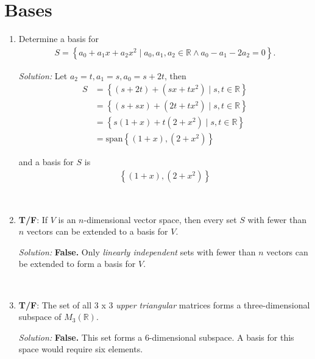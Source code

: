 \documentclass[a4paper,10pt]{report}
\begin{document}
\chapter{Bases}
\begin{enumerate}
  \item
    Determine a basis for
    \begin{align*}
    S = \left\{a_0 + a_1 x + a_2 x^2\mid a_0,a_1,a_2 \in \mathbb{R} \land a_0 - a_1 -2a_2 =0\right\}.
    \end{align*}

    \hrulefill

    \textit{Solution:}
    Let $a_2=t, a_1=s, a_0=s+2t$, then
    \begin{align*}
    S 	  &= \left\{ (s+2t) + (sx+tx^2)\mid s,t\in\mathbb{R} \right\} \\
	  &= \left\{ (s+sx) + (2t+tx^2)\mid s,t\in\mathbb{R} \right\} \\
	  &= \left\{ s(1+x) + t(2+x^2)\mid s,t\in\mathbb{R} \right\} \\
	  &= \text{span}\left\{(1+x),(2+x^2)\right\}
    \end{align*}

    and a basis for $S$ is
    \begin{align*}
    \left\{(1+x), (2+x^2)\right\}
    \end{align*}

    \hrulefill \\

  \item
    \textbf{T/F}: If $V$ is an $n$-dimensional vector space, then every set $S$ with fewer than $n$ vectors can be extended to a basis for $V$.

    \hrulefill

    \textit{Solution:}
      \textbf{False.} Only \textit{linearly independent} sets with fewer than $n$ vectors can be extended to form a basis for $V$.

    \hrulefill \\

  \item
    \textbf{T/F}: The set of all 3 x 3 \textit{upper triangular} matrices forms a three-dimensional subspace of $M_{3}(\mathbb{R})$.

    \hrulefill

    \textit{Solution:}
      \textbf{False.} This set forms a 6-dimensional subspace. A basis for this space would require six elements.

    \hrulefill \\


\end{enumerate}
\end{document}
